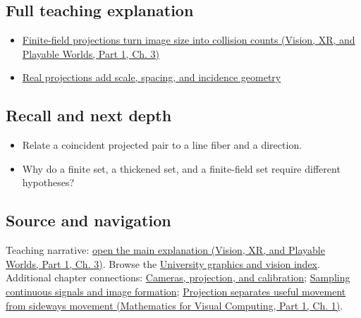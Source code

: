 \subsection{Full teaching explanation}\label{appendix-3c73f7862157-full-teaching-explanation}

\hypertarget{appendix-3c73f7862157-full-teaching-explanation}{}

\begin{itemize}
\tightlist
\item
  \href{../07-Vision-XR-and-Playable-Worlds-P01/main.pdf\#04-visual-computing-ii-ch032-finite-field-projections-turn-image-size-into-collision-counts}{Finite-field projections turn image size into collision counts (Vision, XR, and Playable Worlds, Part 1, Ch. 3)}
\item
  \hyperref[04-visual-computing-ii-ch033-real-projections-add-scale-spacing-and-incidence-geometry]{Real projections add scale, spacing, and incidence geometry}
\end{itemize}

\subsection{Recall and next depth}\label{appendix-3c73f7862157-recall-and-next-depth}

\hypertarget{appendix-3c73f7862157-recall-and-next-depth}{}

\begin{itemize}
\tightlist
\item
  Relate a coincident projected pair to a line fiber and a direction.
\item
  Why do a finite set, a thickened set, and a finite-field set require different hypotheses?
\end{itemize}

\subsection{Source and navigation}\label{appendix-3c73f7862157-source-and-navigation}

\hypertarget{appendix-3c73f7862157-source-and-navigation}{}

Teaching narrative: \href{../07-Vision-XR-and-Playable-Worlds-P01/main.pdf\#04-visual-computing-ii-ch032-finite-field-projections-turn-image-size-into-collision-counts}{open the main explanation (Vision, XR, and Playable Worlds, Part 1, Ch. 3)}. Browse the \hyperref[appendix-a6d556a4ef50-university-graphics-vision-and-photography---independent-series]{University graphics and vision index}. Additional chapter connections: \hyperref[03-visual-computing-i-ch003-cameras-projection-and-calibration]{Cameras, projection, and calibration}; \hyperref[03-visual-computing-i-ch003-sampling-continuous-signals-and-image-formation]{Sampling continuous signals and image formation}; \href{../02-Mathematics-for-Visual-Computing-P01/main.pdf\#01-foundations-i-ch017-projection-separates-useful-movement-from-sideways-movement}{Projection separates useful movement from sideways movement (Mathematics for Visual Computing, Part 1, Ch. 1)}.

